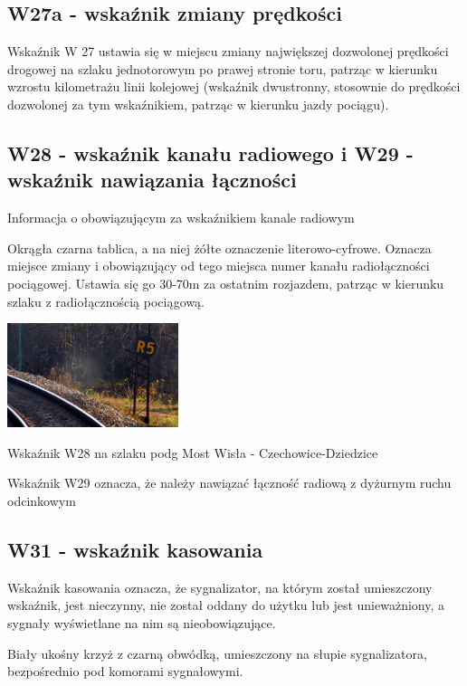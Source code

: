 \subsection{W27a - wskaźnik zmiany prędkości}

Wskaźnik W 27 ustawia się w miejscu zmiany największej dozwolonej prędkości drogowej na szlaku jednotorowym po prawej stronie toru, patrząc w kierunku wzrostu kilometrażu linii kolejowej (wskaźnik dwustronny, stosownie do prędkości dozwolonej za tym wskaźnikiem, patrząc w kierunku jazdy pociągu).

\subsection{W28 - wskaźnik kanału radiowego i W29 - wskaźnik nawiązania łączności}

\begin{tcolorbox}[colback=black!5!white,colframe=white!55!black,title=Wskaźnik W28]Informacja o obowiązującym za wskaźnikiem kanale radiowym
\end{tcolorbox}
Okrągła czarna tablica, a na niej żółte oznaczenie literowo-cyfrowe. Oznacza miejsce zmiany i obowiązujący od tego miejsca numer kanału radiołączności pociągowej. Ustawia się go 30-70m za ostatnim rozjazdem, patrząc w kierunku szlaku z radiołącznością pociągową.
\begin{marginfigure}
		\includegraphics[width=5cm]{skryptkierownik-img/skryptkierownik-img019.jpg}
		\caption{Wskaźnik W28 na szlaku podg Most Wisła - Czechowice-Dziedzice}
		\label{fig:w28}
\end{marginfigure}

Wskaźnik W29 oznacza, że należy nawiązać łączność radiową z dyżurnym ruchu odcinkowym

\subsection{W31 - wskaźnik kasowania}
\begin{tcolorbox}[colback=black!5!white,colframe=white!55!black,title=Wskaźnik W31]
{\textquotedbl}Wskaźnik kasowania{\textquotedbl} oznacza, że sygnalizator, na którym został umieszczony wskaźnik, jest nieczynny, nie został oddany do użytku lub jest unieważniony, a sygnały wyświetlane na nim są nieobowiązujące.
\end{tcolorbox}
Biały ukośny krzyż z czarną obwódką, umieszczony na słupie sygnalizatora, bezpośrednio pod komorami sygnałowymi.


